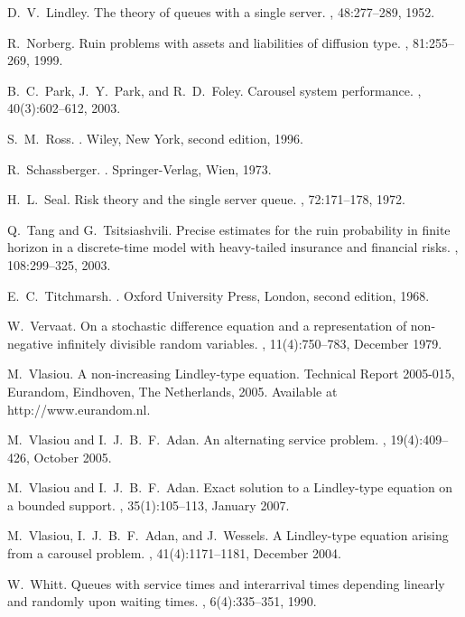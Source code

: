 \documentclass[reqno, 11pt, a4paper]{article}
\theoremstyle{plain}
\theoremstyle{remark}
\numberwithin{equation}{section}
\begin{document}
\begin{thebibliography}{28}
D.~V.~Lindley.
\newblock The theory of queues with a single server.
, 48:277--289, 1952.

R.~Norberg.
\newblock Ruin problems with assets and liabilities of diffusion type.
, 81:255--269, 1999.

B.~C.~Park, J.~Y.~Park, and R.~D.~Foley.
\newblock Carousel system performance.
, 40(3):602--612, 2003.

S.~M.~Ross.
.
\newblock Wiley, New York, second edition, 1996.

R.~Schassberger.
.
\newblock Springer-Verlag, Wien, 1973.

H.~L.~Seal.
\newblock Risk theory and the single server queue.
, 72:171--178, 1972.

Q.~Tang and G.~Tsitsiashvili.
\newblock Precise estimates for the ruin probability in finite horizon in a discrete-time model with heavy-tailed insurance and financial risks.
, 108:299--325, 2003.

E.~C.~Titchmarsh.
.
\newblock Oxford University Press, London, second edition, 1968.

W.~Vervaat.
\newblock On a stochastic difference equation and a representation of non-negative infinitely divisible random variables.
, 11(4):750--783, December 1979.

M.~Vlasiou.
\newblock A non-increasing {L}indley-type equation.
\newblock Technical Report 2005-015, Eurandom, Eindhoven, The Netherlands, 2005.
\newblock Available at {{http://www.eurandom.nl}}.

M.~Vlasiou and I.~J.~B.~F.~Adan.
\newblock An alternating service problem.
, 19(4):409--426, October 2005.

M.~Vlasiou and I.~J.~B.~F.~Adan.
\newblock Exact solution to a {L}indley-type equation on a bounded support.
, 35(1):105--113, January 2007.

M.~Vlasiou, I.~J.~B.~F.~Adan, and J.~Wessels.
\newblock A {L}indley-type equation arising from a carousel problem.
, 41(4):1171--1181, December 2004.

W.~Whitt.
\newblock Queues with service times and interarrival times depending linearly and randomly upon waiting times.
, 6(4):335--351, 1990.
\end{thebibliography}
\end{document}
